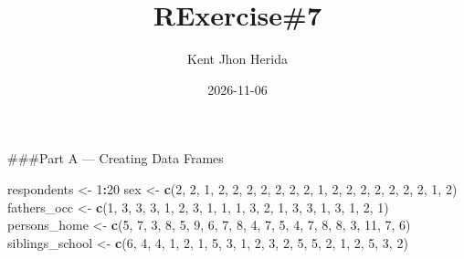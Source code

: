 \documentclass[
]{article}
\title{RExercise\#7}
\author{Kent Jhon Herida}
\date{2026-11-06}
\newenvironment{Shaded}{\begin{snugshade}}{\end{snugshade}}
\newcommand{\DecValTok}[1]{\textcolor[rgb]{0.00,0.00,0.81}{#1}}
\newcommand{\FunctionTok}[1]{\textcolor[rgb]{0.13,0.29,0.53}{\textbf{#1}}}
\newcommand{\NormalTok}[1]{#1}
\newcommand{\OtherTok}[1]{\textcolor[rgb]{0.56,0.35,0.01}{#1}}
\newcommand{\SpecialCharTok}[1]{\textcolor[rgb]{0.81,0.36,0.00}{\textbf{#1}}}
\begin{document}
\maketitle

\#\#\#Part A --- Creating Data Frames

\begin{Shaded}
\begin{Highlighting}[]
\NormalTok{respondents }\OtherTok{\textless{}{-}} \DecValTok{1}\SpecialCharTok{:}\DecValTok{20}
\NormalTok{sex }\OtherTok{\textless{}{-}} \FunctionTok{c}\NormalTok{(}\DecValTok{2}\NormalTok{, }\DecValTok{2}\NormalTok{, }\DecValTok{1}\NormalTok{, }\DecValTok{2}\NormalTok{, }\DecValTok{2}\NormalTok{, }\DecValTok{2}\NormalTok{, }\DecValTok{2}\NormalTok{, }\DecValTok{2}\NormalTok{, }\DecValTok{2}\NormalTok{, }\DecValTok{2}\NormalTok{, }\DecValTok{1}\NormalTok{, }\DecValTok{2}\NormalTok{, }\DecValTok{2}\NormalTok{, }\DecValTok{2}\NormalTok{, }\DecValTok{2}\NormalTok{, }\DecValTok{2}\NormalTok{, }\DecValTok{2}\NormalTok{, }\DecValTok{2}\NormalTok{, }\DecValTok{1}\NormalTok{, }\DecValTok{2}\NormalTok{)}
\NormalTok{fathers\_occ }\OtherTok{\textless{}{-}} \FunctionTok{c}\NormalTok{(}\DecValTok{1}\NormalTok{, }\DecValTok{3}\NormalTok{, }\DecValTok{3}\NormalTok{, }\DecValTok{3}\NormalTok{, }\DecValTok{1}\NormalTok{, }\DecValTok{2}\NormalTok{, }\DecValTok{3}\NormalTok{, }\DecValTok{1}\NormalTok{, }\DecValTok{1}\NormalTok{, }\DecValTok{1}\NormalTok{, }\DecValTok{3}\NormalTok{, }\DecValTok{2}\NormalTok{, }\DecValTok{1}\NormalTok{, }\DecValTok{3}\NormalTok{, }\DecValTok{3}\NormalTok{, }\DecValTok{1}\NormalTok{, }\DecValTok{3}\NormalTok{, }\DecValTok{1}\NormalTok{, }\DecValTok{2}\NormalTok{, }\DecValTok{1}\NormalTok{)}
\NormalTok{persons\_home }\OtherTok{\textless{}{-}} \FunctionTok{c}\NormalTok{(}\DecValTok{5}\NormalTok{, }\DecValTok{7}\NormalTok{, }\DecValTok{3}\NormalTok{, }\DecValTok{8}\NormalTok{, }\DecValTok{5}\NormalTok{, }\DecValTok{9}\NormalTok{, }\DecValTok{6}\NormalTok{, }\DecValTok{7}\NormalTok{, }\DecValTok{8}\NormalTok{, }\DecValTok{4}\NormalTok{, }\DecValTok{7}\NormalTok{, }\DecValTok{5}\NormalTok{, }\DecValTok{4}\NormalTok{, }\DecValTok{7}\NormalTok{, }\DecValTok{8}\NormalTok{, }\DecValTok{8}\NormalTok{, }\DecValTok{3}\NormalTok{, }\DecValTok{11}\NormalTok{, }\DecValTok{7}\NormalTok{, }\DecValTok{6}\NormalTok{)}
\NormalTok{siblings\_school }\OtherTok{\textless{}{-}} \FunctionTok{c}\NormalTok{(}\DecValTok{6}\NormalTok{, }\DecValTok{4}\NormalTok{, }\DecValTok{4}\NormalTok{, }\DecValTok{1}\NormalTok{, }\DecValTok{2}\NormalTok{, }\DecValTok{1}\NormalTok{, }\DecValTok{5}\NormalTok{, }\DecValTok{3}\NormalTok{, }\DecValTok{1}\NormalTok{, }\DecValTok{2}\NormalTok{, }\DecValTok{3}\NormalTok{, }\DecValTok{2}\NormalTok{, }\DecValTok{5}\NormalTok{, }\DecValTok{5}\NormalTok{, }\DecValTok{2}\NormalTok{, }\DecValTok{1}\NormalTok{, }\DecValTok{2}\NormalTok{, }\DecValTok{5}\NormalTok{, }\DecValTok{3}\NormalTok{, }\DecValTok{2}\NormalTok{)}

\end{Highlighting}
\end{Shaded}
\end{document}

